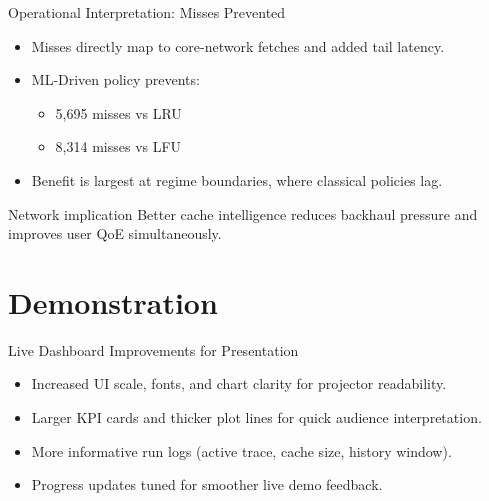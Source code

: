 \documentclass[11pt,aspectratio=169]{beamer}
\begin{document}
\begin{frame}{Operational Interpretation: Misses Prevented}
  \begin{itemize}
    \item Misses directly map to core-network fetches and added tail latency.
    \item ML-Driven policy prevents:
      \begin{itemize}
        \item 5,695 misses vs LRU
        \item 8,314 misses vs LFU
      \end{itemize}
    \item Benefit is largest at regime boundaries, where classical policies lag.
  \end{itemize}
  \begin{block}{Network implication}
    Better cache intelligence reduces backhaul pressure and improves user QoE simultaneously.
  \end{block}
\end{frame}

\section{Demonstration}
\begin{frame}{Live Dashboard Improvements for Presentation}
  \begin{itemize}
    \item Increased UI scale, fonts, and chart clarity for projector readability.
    \item Larger KPI cards and thicker plot lines for quick audience interpretation.
    \item More informative run logs (active trace, cache size, history window).
    \item Progress updates tuned for smoother live demo feedback.
  \end{itemize}
\end{frame}
\end{document}
